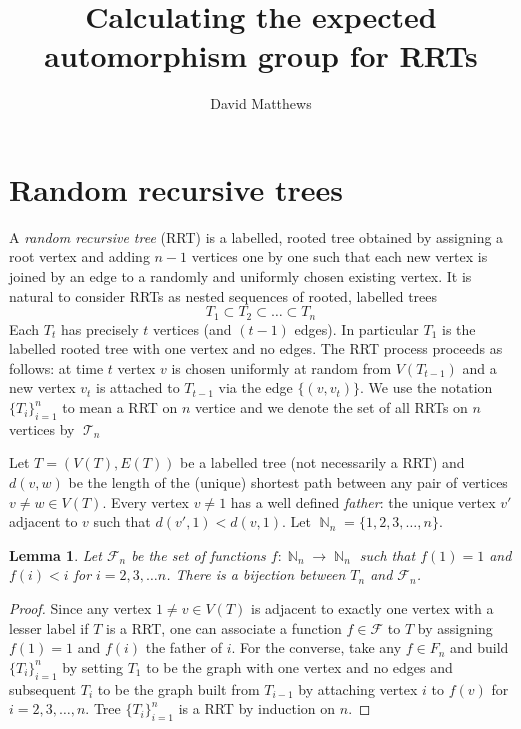 \documentclass[10pt]{amsart} %
\title{Calculating the expected automorphism group for RRTs}
\author{David Matthews}
\newtheorem{lem}[thm]{Lemma}
\theoremstyle{definition}
\DeclareMathOperator{\T}{\mathcal{T}}
\DeclareMathOperator{\N}{\mathbb{N}}
\begin{document}
\maketitle


\section{Random recursive trees}


A \emph{random recursive tree} (RRT) is a labelled, rooted tree obtained by assigning a root vertex and adding $n-1$ vertices one by one such that each new vertex is joined by an edge to a randomly and uniformly chosen existing vertex. It is natural to consider RRTs as nested sequences of rooted, labelled trees
\[T_{1} \subset T_{2} \subset \dots \subset T_{n}\]
Each $T_{t}$ has precisely $t$ vertices (and $(t-1)$ edges).  In particular $T_1$ is the labelled rooted tree with one vertex and no edges.  The RRT process proceeds as follows: at time $t$ vertex $v$ is chosen uniformly at random from $V(T_{t-1})$ and a new vertex $v_{t}$ is attached to $T_{t-1}$ via the edge $\{(v,v_{t})\}$. We use the notation $\{T_i\}_{i=1}^{n}$ to mean a RRT on $n$ vertice and we denote the set of all RRTs on $n$ vertices by $\T_n$

Let $T = (V(T),E(T))$ be a labelled tree (not necessarily a RRT) and $d(v,w)$ be the length of the (unique) shortest path between any pair of vertices $v\neq w \in V(T)$.  Every vertex $v \neq 1 $ has a well defined \emph{father}: the unique vertex $v'$ adjacent to $v$ such that $d(v',1)< d(v,1)$.   Let $\N_n = \{1,2,3,\dots,n\}$. 

\begin{lem}
 Let $\mathcal{F}_n$ be the set of functions $f: \N_n \longrightarrow \N_n$ such that $f(1) = 1$ and $f(i) <i$ for $i = 2,3,\dots n$.  There is a bijection between $T_n$ and $\mathcal{F}_n$.
\end{lem}

\begin{proof}  Since any vertex $1 \neq v \in V(T)$ is adjacent to exactly one vertex with a lesser label if $T$ is a RRT, 
one can associate a function $f \in \mathcal{F}$ to $T$ by assigning  $f(1) =1$ and $f(i)$ the father of $i$. 
For the converse, take any $f \in {F}_n$ and build $\{T_{i}\}_{i=1}^{n}$ by setting $T_1$ to be the graph with one vertex and no edges and subsequent $T_i$ to be the graph built from $T_{i-1}$ by attaching vertex $i$ to $f(v)$ for $i = 2,3,\dots,n$.  Tree $\{T_{i}\}_{i=1}^{n}$ is a RRT by induction on $n$.   
\end{proof}
\end{document}
